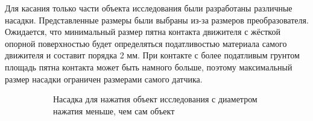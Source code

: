 Для касания только части объекта исследования были разработаны различные насадки. Представленные размеры  были выбраны из-за размеров преобразователя. Ожидается, что минимальный размер пятна контакта движителя с жёсткой опорной поверхностью будет определяться податливостью материала самого движителя и составит порядка 2 мм. При контакте с более податливым грунтом площадь пятна контакта может быть намного больше, поэтому максимальный размер насадки ограничен размерами самого датчика.

\begin{figure}[H]
    \begin{subfigure}[t]{0.99\textwidth}
        \centering
        \caption{Насадка для нажатия объект
            исследования с диаметром нажатия меньше, чем сам объект}
        \label{fig:all_end_effectors.png}
    \end{subfigure}

    \begin{subfigure}[t]{0.99\textwidth}
        \centering
\end{subfigure}
\end{figure}
